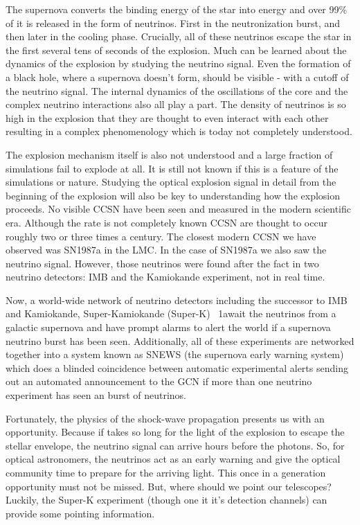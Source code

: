 \documentclass[11pt]{article}
\newcommand{\superk}  {Super\nobreakdash-K\xspace}
\begin{document}
The supernova converts the binding energy of the star into energy and
over 99\% of it is released in the form of neutrinos. First in the
neutronization burst, and then later in the cooling phase.  Crucially,
all of these neutrinos escape the star in the first several tens of
seconds of the explosion. Much can be learned about the dynamics of
the explosion by studying the neutrino signal.  Even the formation of
a black hole, where a supernova doesn't form, should be visible - with
a cutoff of the neutrino signal.  The internal dynamics of the
oscillations of the core and the complex neutrino interactions also
all play a part. The density of neutrinos is so high in the explosion
that they are thought to even interact with each other resulting in a
complex phenomenology which is today not completely understood.

 The explosion mechanism itself is also not understood and a large
 fraction of simulations fail to explode at all.  It is still not
 known if this is a feature of the simulations or nature. Studying the
 optical explosion signal in detail from the beginning of the
 explosion will also be key to understanding how the explosion
 proceeds.  No visible CCSN have been seen and measured in the modern
 scientific era.  Although the rate is not completely known CCSN are
 thought to occur roughly two or three times a century.  The
 closest modern CCSN we have observed was SN1987a in the LMC.   In the
 case of SN1987a we also saw the neutrino signal. However, those
 neutrinos were found after the fact in two neutrino detectors: IMB and the
 Kamiokande experiment, not in real time.

 Now, a world-wide network of neutrino detectors including the
 successor to IMB and Kamiokande, Super-Kamiokande
 (\superk)~\cite{superk_paper} 1await the neutrinos from a galactic
 supernova and have prompt alarms to alert the world if a supernova
 neutrino burst has been seen.  Additionally, all of these experiments
 are networked together into a system known as SNEWS (the supernova
 early warning system) which does a blinded coincidence between
 automatic experimental alerts sending out an automated announcement
 to the GCN if more than one neutrino experiment has seen an burst of
 neutrinos.

Fortunately, the physics of the shock-wave propagation presents us
with an opportunity.  Because if takes so long for the light of the
explosion to escape the stellar envelope, the neutrino signal can
arrive hours before the photons. So, for optical astronomers, the
neutrinos act as an early warning and give the optical community time
to prepare for the arriving light.  This once in a generation
opportunity must not be missed. But, where should we point our
telescopes?  Luckily, the \superk experiment (though one it
it's detection channels) can provide some pointing information.
\end{document}
